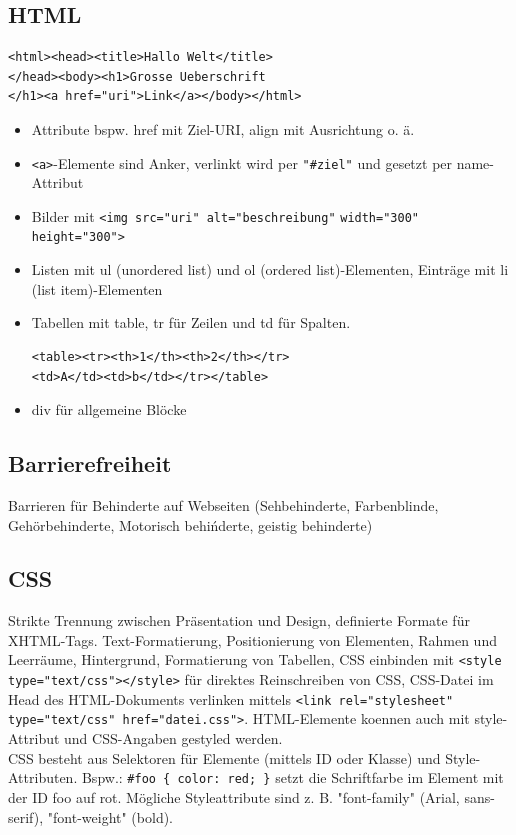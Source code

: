 \documentclass[12pt,landscape]{article}
\begin{document}
\begin{multicols}{3}
\subsection{HTML}
\begin{lstlisting}
<html><head><title>Hallo Welt</title>
</head><body><h1>Grosse Ueberschrift
</h1><a href="uri">Link</a></body></html>
\end{lstlisting}
\begin{itemize}
\item Attribute bspw. href mit Ziel-URI, align mit Ausrichtung o. ä.
\item \lstinline|<a>|-Elemente sind Anker, verlinkt wird per \lstinline|"#ziel"| und gesetzt per name-Attribut
\item Bilder mit
\lstinline|<img src="uri" alt="beschreibung"|
\lstinline|width="300" height="300">|
\item Listen mit ul (unordered list) und ol (ordered list)-Elementen, Einträge mit li (list item)-Elementen
\item Tabellen mit table, tr für Zeilen und td für Spalten.
\begin{lstlisting}
<table><tr><th>1</th><th>2</th></tr>
<td>A</td><td>b</td></tr></table>
\end{lstlisting}
\item div für allgemeine Blöcke
\end{itemize}
\subsection{Barrierefreiheit}
Barrieren für Behinderte auf Webseiten (Sehbehinderte, Farbenblinde, Gehörbehinderte, Motorisch behińderte, geistig behinderte)
\subsection{CSS}
Strikte Trennung zwischen Präsentation und Design, definierte Formate für XHTML-Tags. Text-Formatierung, Positionierung von Elementen, Rahmen und Leerräume, Hintergrund, Formatierung von Tabellen, CSS einbinden mit \lstinline|<style type="text/css"></style>| für direktes Reinschreiben von CSS, CSS-Datei im Head des HTML-Dokuments verlinken mittels \lstinline|<link rel="stylesheet"| \lstinline|type="text/css" href="datei.css">|. HTML-Elemente koennen auch mit style-Attribut und CSS-Angaben gestyled werden.\\
CSS besteht aus Selektoren für Elemente (mittels ID oder Klasse) und Style-Attributen. Bspw.: \lstinline|#foo { color: red; }| setzt die Schriftfarbe im Element mit der ID foo auf rot. Mögliche Styleattribute sind z. B. "font-family" (Arial, sans-serif), "font-weight" (bold).\\

\end{multicols}
\end{document}
